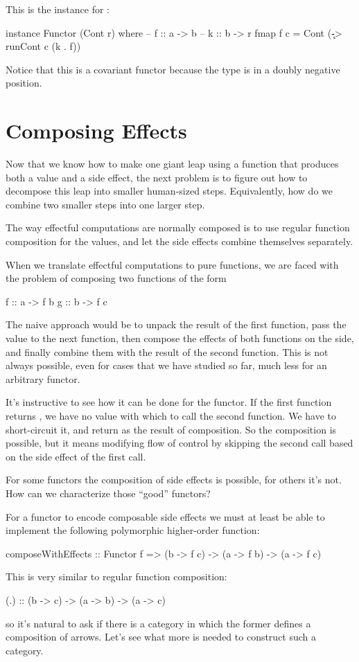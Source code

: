 \documentclass[DaoFP]{subfiles}
\begin{document}
This is the  instance for :
\begin{haskell}
instance Functor (Cont r) where
  -- f :: a -> b
  -- k :: b -> r
  fmap f c = Cont (\k -> runCont c (k . f))
\end{haskell}
Notice that this is a covariant functor because the type  is in a doubly negative position.

\section{Composing Effects}

Now that we know how to make one giant leap using a function that produces both a value and a side effect, the next problem is to figure out how to decompose this leap into smaller human-sized steps. Equivalently, how do we combine two smaller steps into one larger step. 

The way effectful computations are normally composed is to use regular function composition for the values, and let the side effects combine themselves separately. 

When we translate effectful computations to pure functions, we are faced with the problem of composing two functions of the form
\begin{haskell}
f :: a -> f b
g :: b -> f c
\end{haskell}

The naive approach would be to unpack the result of the first function, pass the value to the next function, then compose the effects of both functions on the side, and finally combine them with the result of the second function. This is not always possible, even for cases that we have studied so far, much less for an arbitrary functor.

It's instructive to see how it can be done for the  functor. If the first function returns , we have no value with which to call the second function. We have to short-circuit it, and return  as the result of composition. So the composition is possible, but it means modifying flow of control by skipping the second call based on the side effect of the first call. 

For some functors the composition of side effects is possible, for others it's not. How can we characterize those ``good'' functors?

For a functor to encode composable side effects we must at least be able to implement the following polymorphic higher-order function: 
\begin{haskell}
composeWithEffects :: Functor f => 
       (b -> f c) -> (a -> f b) -> (a -> f c)
\end{haskell}
This is very similar to regular function composition:
\begin{haskell}
(.) :: (b -> c) -> (a -> b) -> (a -> c)
\end{haskell}
so it's natural to ask if there is a category in which the former defines a composition of arrows. Let's see what more is needed to construct such a category.
\end{document}

